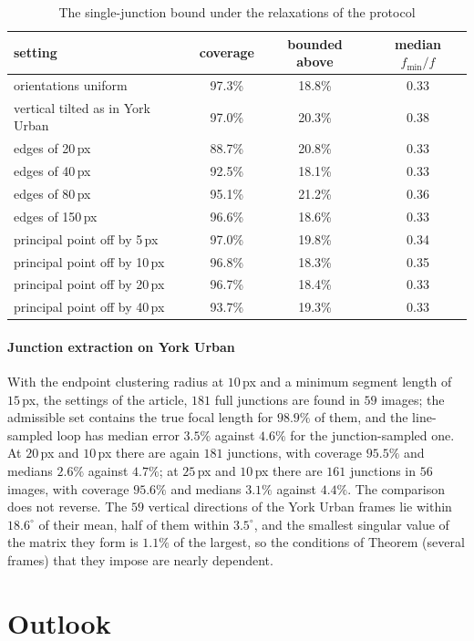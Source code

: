 \begin{table}[h]
\centering\small
\caption{The single-junction bound under the relaxations of the protocol}
\label{tab:Srobust}
\begin{tabular}{lccc}
\toprule
setting & coverage & bounded above & median $f_{\min}/f$\\
\midrule
orientations uniform & 97.3\% & 18.8\% & 0.33\\
vertical tilted as in York Urban & 97.0\% & 20.3\% & 0.38\\
edges of 20\,px & 88.7\% & 20.8\% & 0.33\\
edges of 40\,px & 92.5\% & 18.1\% & 0.33\\
edges of 80\,px & 95.1\% & 21.2\% & 0.36\\
edges of 150\,px & 96.6\% & 18.6\% & 0.33\\
principal point off by 5\,px & 97.0\% & 19.8\% & 0.34\\
principal point off by 10\,px & 96.8\% & 18.3\% & 0.35\\
principal point off by 20\,px & 96.7\% & 18.4\% & 0.33\\
principal point off by 40\,px & 93.7\% & 19.3\% & 0.33\\
\bottomrule
\end{tabular}
\end{table}

\subsection{Junction extraction on York Urban}\label{sec:Sextract}
With the endpoint clustering radius at $10$\,px and a minimum segment length of $15$\,px, the settings of the article, $181$ full junctions are found in $59$ images; the admissible set contains the true focal length for $98.9\%$ of them, and the line-sampled loop has median error $3.5\%$ against $4.6\%$ for the junction-sampled one. At $20$\,px and $10$\,px there are again $181$ junctions, with coverage $95.5\%$ and medians $2.6\%$ against $4.7\%$; at $25$\,px and $10$\,px there are $161$ junctions in $56$ images, with coverage $95.6\%$ and medians $3.1\%$ against $4.4\%$. The comparison does not reverse. The $59$ vertical directions of the York Urban frames lie within $18.6^\circ$ of their mean, half of them within $3.5^\circ$, and the smallest singular value of the matrix they form is $1.1\%$ of the largest, so the conditions of Theorem (several frames) that they impose are nearly dependent.

\part{Outlook}

